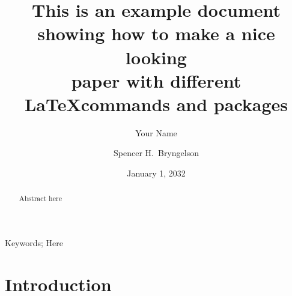 



\hypersetup{
  linkcolor=darkrust,
  citecolor=seagreen,
  urlcolor=darkrust,
  pdfauthor=author,
}

\begin{frontmatter}

\title{{\large\bfseries This is an example document showing how to make a nice looking \\ paper with different \LaTeX commands and packages}}

\author[1]{\vspace{-3ex}Your Name}
\author[2]{Spencer H.\ Bryngelson}

\address[1]{Some other School, Georgia Institute of Technology, Atlanta, GA 30332, USA}
\address[2]{School of Computational Science \& Engineering, Georgia Institute of Technology, Atlanta, GA 30332, USA}


\date{January 1, 2032}

\begin{abstract}
Abstract here
\end{abstract}

\begin{keyword}
   Keywords; Here 
\end{keyword}

\end{frontmatter}

\section{Introduction}

